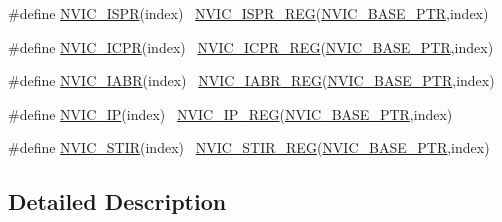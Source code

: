 \begin{DoxyCompactItemize}
\item 
\#define \hyperlink{group___n_v_i_c___register___accessor___macros_ga78a49b368101fc22c94add06f7249395}{N\+V\+I\+C\+\_\+\+I\+S\+PR}(index)                                              ~\hyperlink{group___n_v_i_c___register___accessor___macros_ga6678e35df7fd1dd4a3f515e73983377c}{N\+V\+I\+C\+\_\+\+I\+S\+P\+R\+\_\+\+R\+EG}(\hyperlink{group___n_v_i_c___peripheral_ga28f0a055d0c218e16d1fc7b13ff0caa5}{N\+V\+I\+C\+\_\+\+B\+A\+S\+E\+\_\+\+P\+TR},index)
\item 
\#define \hyperlink{group___n_v_i_c___register___accessor___macros_ga5a39e5d4659db96881c1f6de24ec47e5}{N\+V\+I\+C\+\_\+\+I\+C\+PR}(index)                                              ~\hyperlink{group___n_v_i_c___register___accessor___macros_gac541bfbfb551d341170d1535a18208b9}{N\+V\+I\+C\+\_\+\+I\+C\+P\+R\+\_\+\+R\+EG}(\hyperlink{group___n_v_i_c___peripheral_ga28f0a055d0c218e16d1fc7b13ff0caa5}{N\+V\+I\+C\+\_\+\+B\+A\+S\+E\+\_\+\+P\+TR},index)
\item 
\#define \hyperlink{group___n_v_i_c___register___accessor___macros_gaf953d0f112753c05f951d7163e98e6fc}{N\+V\+I\+C\+\_\+\+I\+A\+BR}(index)                                              ~\hyperlink{group___n_v_i_c___register___accessor___macros_gafa3b717b76dfe3379645d3c4eaebaf6b}{N\+V\+I\+C\+\_\+\+I\+A\+B\+R\+\_\+\+R\+EG}(\hyperlink{group___n_v_i_c___peripheral_ga28f0a055d0c218e16d1fc7b13ff0caa5}{N\+V\+I\+C\+\_\+\+B\+A\+S\+E\+\_\+\+P\+TR},index)
\item 
\#define \hyperlink{group___n_v_i_c___register___accessor___macros_gad215e21e79fd6c4c0b310324a51b0a34}{N\+V\+I\+C\+\_\+\+IP}(index)                                                  ~\hyperlink{group___n_v_i_c___register___accessor___macros_gac7b3df65f95ff3ad60a655db439a45a2}{N\+V\+I\+C\+\_\+\+I\+P\+\_\+\+R\+EG}(\hyperlink{group___n_v_i_c___peripheral_ga28f0a055d0c218e16d1fc7b13ff0caa5}{N\+V\+I\+C\+\_\+\+B\+A\+S\+E\+\_\+\+P\+TR},index)
\item 
\#define \hyperlink{group___n_v_i_c___register___accessor___macros_gab9c445f4619c4c409389ab409be52b99}{N\+V\+I\+C\+\_\+\+S\+T\+IR}(index)                                              ~\hyperlink{group___n_v_i_c___register___accessor___macros_gae670827a5fdf3912afe9fa24578a19e3}{N\+V\+I\+C\+\_\+\+S\+T\+I\+R\+\_\+\+R\+EG}(\hyperlink{group___n_v_i_c___peripheral_ga28f0a055d0c218e16d1fc7b13ff0caa5}{N\+V\+I\+C\+\_\+\+B\+A\+S\+E\+\_\+\+P\+TR},index)
\end{DoxyCompactItemize}


\subsection{Detailed Description}


